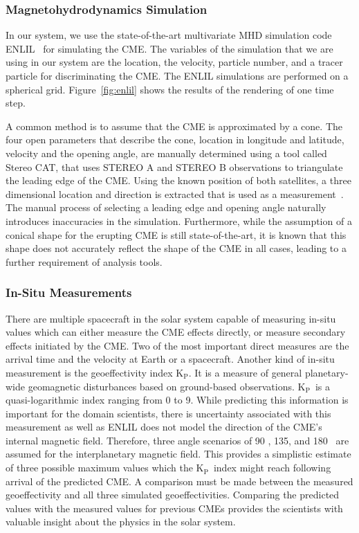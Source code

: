 \documentclass[journal]{vgtc}                %
\newcommand{\kpIndex}{$\textrm{K}_\textrm{P}$}
\begin{document}
\subsubsection{Magnetohydrodynamics Simulation} \label{sec:mhd}
In our system, we use the state-of-the-art multivariate MHD simulation code ENLIL~\cite{odstrcil2002merging} for simulating the CME. The variables of the simulation that we are using in our system are the location, the velocity, particle number, and a tracer particle for discriminating the CME. The ENLIL simulations are performed on a spherical grid. Figure~\ref{fig:enlil} shows the results of the rendering of one time step.

A common method is to assume that the CME is approximated by a cone. The four open parameters that describe the cone, location in longitude and latitude, velocity and the opening angle, are manually determined using a tool called Stereo CAT, that uses STEREO A and STEREO B observations to triangulate the leading edge of the CME. Using the known position of both satellites, a three dimensional location and direction is extracted that is used as a measurement~\cite{Millward:2013cm}. The manual process of selecting a leading edge and opening angle naturally introduces inaccuracies in the simulation. Furthermore, while the assumption of a conical shape for the erupting CME is still state-of-the-art, it is known that this shape does not accurately reflect the shape of the CME in all cases, leading to a further requirement of analysis tools.

\subsubsection{In-Situ Measurements} \label{sec:insitu}
There are multiple spacecraft in the solar system capable of measuring in-situ values which can either measure the CME effects directly, or measure secondary effects initiated by the CME. Two of the most important direct measures are the arrival time and the velocity at Earth or a spacecraft. Another kind of in-situ measurement is the geoeffectivity index \kpIndex. It is a measure of general planetary-wide geomagnetic disturbances based on ground-based observations. \kpIndex\ is a quasi-logarithmic index ranging from 0 to 9. While predicting this information is important for the domain scientists, there is uncertainty associated with this measurement as well as ENLIL does not model the direction of the CME's internal magnetic field. Therefore, three angle scenarios of 90 \degree , 135\degree , and 180 \degree\ are assumed for the interplanetary magnetic field. This provides a simplistic estimate of three possible maximum values which the \kpIndex\ index might reach following arrival of the predicted CME. A comparison must be made between the measured geoeffectivity and all three simulated geoeffectivities. Comparing the predicted values with the measured values for previous CMEs provides the scientists with valuable insight about the physics in the solar system. 
\end{document}
